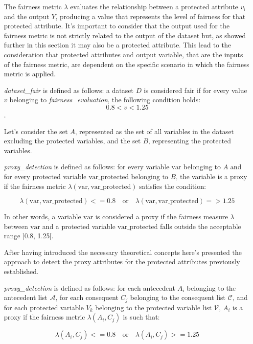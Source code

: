 \documentclass[12pt,a4paper,openright,twoside]{book}
\begin{document}
The fairness metric \( \lambda \) evaluates the relationship between a protected attribute \( v_i \) and the output \( Y \), producing a value that represents the level of fairness for that protected attribute. It's important to consider that the output used for the fairness metric is not strictly related to the output of the dataset but, as showed further in this section it may also be a protected attribute. This lead to the consideration that protected attributes and output variable, that are the inputs of the fairness metric, are dependent on the specific scenario in which the fairness metric is applied.

\textit{dataset\_fair} is defined as follows: a dataset \( D \) is considered fair if for every value \( v \) belonging to \textit{fairness\_evaluation}, the following condition holds:
\[ 0.8  < v < 1.25 \].

Let's consider the set \( A \), represented as the set of all variables in the dataset excluding the protected variables, and the set \( B \), representing the protected variables.

\textit{proxy\_detection} is defined as follows: for every variable \( \text{var} \) belonging to \( A \) and for every protected variable \( \text{var\_protected} \) belonging to \( B \), the variable is a proxy if the fairness metric \( \lambda(\text{var}, \text{var\_protected}) \) satisfies the condition:

\[
\lambda(\text{var}, \text{var\_protected}) <= 0.8 \quad \text{or} \quad \lambda(\text{var}, \text{var\_protected}) => 1.25
\]

In other words, a variable \( \text{var} \) is considered a proxy if the fairness measure \( \lambda \) between \( \text{var} \) and a protected variable \( \text{var\_protected} \) falls outside the acceptable range ]0.8, 1.25[.

After having introduced the necessary theoretical concepts here's presented the approach to detect the proxy attributes for the protected attributes previously established.

\textit{proxy\_detection} is defined as follows: for each antecedent \( A_i \) belonging to the antecedent list \( \mathcal{A} \), for each consequent \( C_j \) belonging to the consequent list \( \mathcal{C} \), and for each protected variable \( V_k \) belonging to the protected variable list \( \mathcal{V} \), \( A_i \) is a proxy if the fairness metric \( \lambda(A_i, C_j) \) is such that:

\[\lambda(A_i, C_j) <= 0.8 \quad \text{or} \quad \lambda(A_i, C_j) >= 1.25\]
\end{document}
